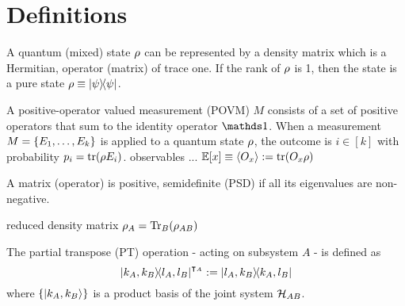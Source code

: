 

\section{Definitions}\label{sec:definitions}
\begin{definition}\label{def:density_matrix}
	A quantum (mixed) state $\rho$ can be represented by a density matrix which is a Hermitian,  operator (matrix) of trace one. 
	If the rank of $\rho$ is 1, then the state is a pure state $\rho\equiv\op{\psi}$.
\end{definition}
\begin{definition}[POVM]\label{def:povm}
	A positive-operator valued measurement (POVM) $M$ consists of a set of positive operators that sum to the identity operator $\identity$. 
	When a measurement $M = \qty{ E_1 , \dots , E_k }$ is applied to a quantum state $\rho$, the outcome is $i \in [k]$ with probability $p_i = \tr( \rho E_i )$.
	observables ... $\mathbb{E}[x]\equiv\expval{O_x}:=\tr(O_x\rho)$
\end{definition}
\begin{definition}[PSD]\label{def:psd}
	A matrix (operator) is positive, semidefinite (PSD) if all its eigenvalues are non-negative.
\end{definition}
\begin{definition}\label{def:reduced_density_matrix}
	reduced density matrix $\rho_A = \Tr_B(\rho_{AB})$
\end{definition}
\begin{definition}\label{def:partial_transpose}
	\cite{horodeckiSeparabilityMixedStates1996}
	The partial transpose (PT) operation - acting on subsystem $A$ - is defined as
	\begin{equation}
		\op{k_A,k_B}{l_A,l_B}^{\intercal_A}
		:= \op{l_A,k_B}{k_A,l_B}
	\end{equation}
	where $\qty{\ket{k_A,k_B}}$ is a product basis of the joint system $\mathcal{H}_{AB}$.
\end{definition}
